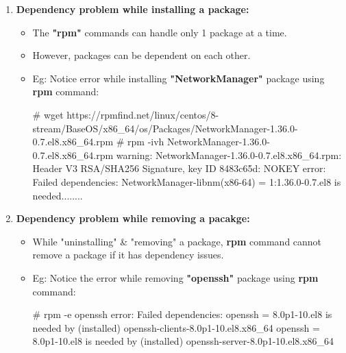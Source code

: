 \setlength{\columnsep}{3pt}
\begin{flushleft}
	\begin{enumerate}
		\item \textbf{Dependency problem while installing a package:}
		\begin{itemize}
			\item The \textbf{"rpm"} commands can handle only 1 package at a time.
			\item However, packages can be dependent on each other.
			\item Eg: Notice error while installing \textbf{"NetworkManager"} package using \textbf{rpm} command:
			\begin{tcolorbox}[breakable,notitle,boxrule=-0pt,colback=black,colframe=black]
				\font=9pt
				\color{green}
				\# wget https://rpmfind.net/linux/centos/8-stream/BaseOS/x86\_64/os/Packages/NetworkManager-1.36.0-0.7.el8.x86\_64.rpm
				\newline
				\# rpm -ivh NetworkManager-1.36.0-0.7.el8.x86\_64.rpm
				\color{red}\newline
				warning: NetworkManager-1.36.0-0.7.el8.x86\_64.rpm: Header V3 RSA/SHA256 Signature, key ID 8483c65d: NOKEY
				\newline
				error: Failed dependencies:
				\newline
				NetworkManager-libnm(x86-64) = 1:1.36.0-0.7.el8 is needed........
				\font=4pt
			\end{tcolorbox}
			\end{itemize}

			\item \textbf{Dependency problem while removing a pacakge:}
			\begin{itemize}
				\item While "uninstalling" \& "removing" a package, \textbf{rpm} command cannot remove a package if it has dependency issues.
				\item Eg: Notice the error while removing \textbf{"openssh"} package using \textbf{rpm} command:
				\bigskip
				\begin{tcolorbox}[breakable,notitle,boxrule=-0pt,colback=black,colframe=black]
					\color{green}
					\font=9pt
					\# rpm -e openssh
					\color{red}
					\newline
					error: Failed dependencies:
					\newline
					openssh = 8.0p1-10.el8 is needed by (installed) openssh-clients-8.0p1-10.el8.x86\_64
					\newline
					openssh = 8.0p1-10.el8 is needed by (installed) openssh-server-8.0p1-10.el8.x86\_64
					\font=4pt
				\end{tcolorbox}				
			\end{itemize}

	\end{enumerate}

\end{flushleft}
\newpage


